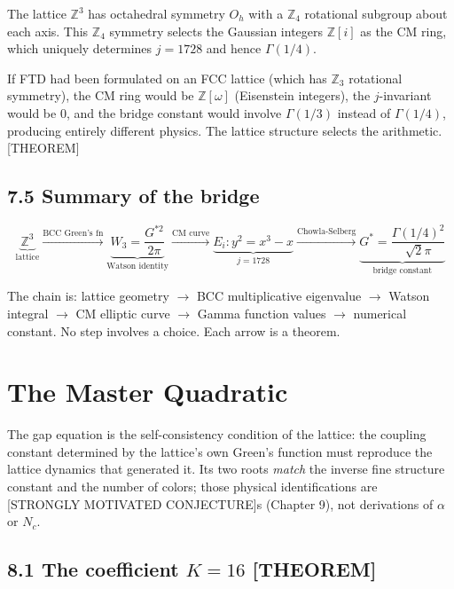 \documentclass[
  11pt,
  letterpaper,
  twoside,
  openright]{book}
\begin{document}
The lattice \(\mathbb{Z}^3\) has octahedral symmetry \(O_h\) with a
\(\mathbb{Z}_4\) rotational subgroup about each axis. This
\(\mathbb{Z}_4\) symmetry selects the Gaussian integers
\(\mathbb{Z}[i]\) as the CM ring, which uniquely determines \(j = 1728\)
and hence \(\Gamma(1/4)\).

If FTD had been formulated on an FCC lattice (which has \(\mathbb{Z}_3\)
rotational symmetry), the CM ring would be \(\mathbb{Z}[\omega]\)
(Eisenstein integers), the \(j\)-invariant would be 0, and the bridge
constant would involve \(\Gamma(1/3)\) instead of \(\Gamma(1/4)\),
producing entirely different physics. The lattice structure selects the
arithmetic. {[}THEOREM{]}

\section{7.5 Summary of the bridge}\label{summary-of-the-bridge}

\[
\underbrace{\mathbb{Z}^3}_{\text{lattice}} \xrightarrow{\text{BCC Green's fn}} \underbrace{W_3 = \frac{G^{*2}}{2\pi}}_{\text{Watson identity}} \xrightarrow{\text{CM curve}} \underbrace{E_i: y^2 = x^3 - x}_{\text{$j = 1728$}} \xrightarrow{\text{Chowla-Selberg}} \underbrace{G^* = \frac{\Gamma(1/4)^2}{\sqrt{2}\pi}}_{\text{bridge constant}}
\]

The chain is: lattice geometry \(\to\) BCC multiplicative eigenvalue
\(\to\) Watson integral \(\to\) CM elliptic curve \(\to\) Gamma function
values \(\to\) numerical constant. No step involves a choice. Each arrow
is a theorem.

\chapter{The Master Quadratic}\label{sec-quadratic}

The gap equation is the self-consistency condition of the lattice: the
coupling constant determined by the lattice's own Green's function must
reproduce the lattice dynamics that generated it. Its two roots
\emph{match} the inverse fine structure constant and the number of
colors; those physical identifications are {[}STRONGLY MOTIVATED
CONJECTURE{]}s (Chapter 9), not derivations of \(\alpha\) or \(N_c\).

\section{\texorpdfstring{8.1 The coefficient \(K = 16\)
{[}THEOREM{]}}{8.1 The coefficient K = 16 {[}THEOREM{]}}}\label{the-coefficient-k-16-theorem}
\end{document}

